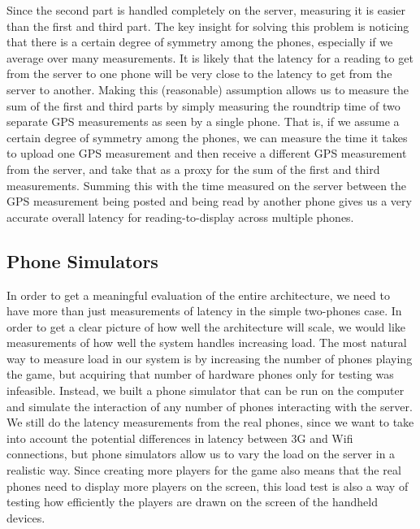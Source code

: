 \documentclass{acm_proc_article-sp}
\begin{document}
Since the second part is handled completely on the server, measuring
it is easier than the first and third part.  The key insight for
solving this problem is noticing that there is a certain degree of
symmetry among the phones, especially if we average over many
measurements.  It is likely that the latency for a reading to get from
the server to one phone will be very close to the latency to get from
the server to another.  Making this (reasonable) assumption allows us
to measure the sum of the first and third parts by simply measuring
the roundtrip time of two separate GPS measurements as seen by a
single phone.  That is, if we assume a certain degree of symmetry
among the phones, we can measure the time it takes to upload one GPS
measurement and then receive a different GPS measurement from the
server, and take that as a proxy for the sum of the first and third
measurements.  Summing this with the time measured on the server
between the GPS measurement being posted and being read by another
phone gives us a very accurate overall latency for reading-to-display
across multiple phones.

\subsection{Phone Simulators}
In order to get a meaningful evaluation of the entire architecture, we
need to have more than just measurements of latency in the simple
two-phones case.  In order to get a clear picture of how well the
architecture will scale, we would like measurements of how well the
system handles increasing load.  The most natural way to measure load
in our system is by increasing the number of phones playing the game,
but acquiring that number of hardware phones only for testing was
infeasible.  Instead, we built a phone simulator that can be run on
the computer and simulate the interaction of any number of phones
interacting with the server. We still do the latency measurements from
the real phones, since we want to take into account the potential
differences in latency between 3G and Wifi connections, but phone
simulators allow us to vary the load on the server in a realistic
way. Since creating more players for the game also means that the real
phones need to display more players on the screen, this load test is
also a way of testing how efficiently the players are drawn on the
screen of the handheld devices.
\end{document}
